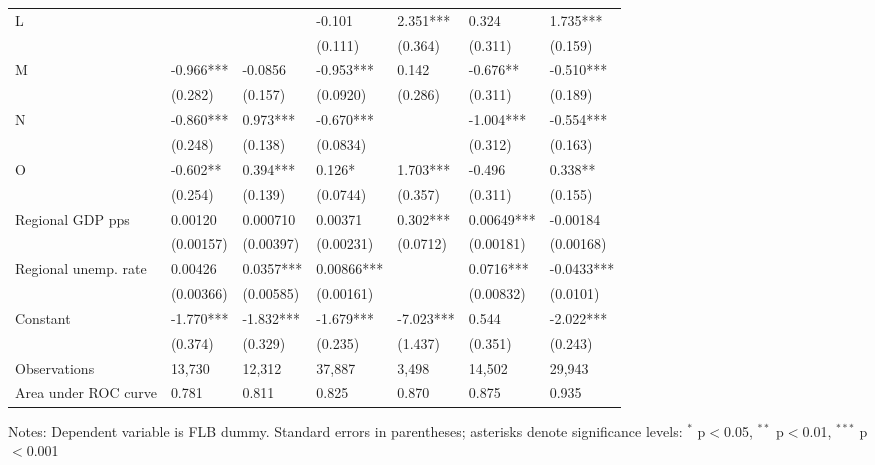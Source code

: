 \documentclass[12pt]{article}
\begin{document}
\begin{table}[thb]
{\begin{threeparttable}
\begin{tabular}{l*{6}{l}}
\quad L                   &            &           & -0.101     & 2.351***  & 0.324      & 1.735***   \\
                          &            &           & (0.111)    & (0.364)   & (0.311)    & (0.159)    \\[0.5ex]

\quad M                   &  -0.966*** & -0.0856   & -0.953***  & 0.142     & -0.676**   & -0.510***  \\
                          &  (0.282)   & (0.157)   & (0.0920)   & (0.286)   & (0.311)    & (0.189)    \\[0.5ex]

\quad N                   &  -0.860*** & 0.973***  & -0.670***  &           & -1.004***  & -0.554***  \\
                          &  (0.248)   & (0.138)   & (0.0834)   &           & (0.312)    & (0.163)    \\[0.5ex]

\quad O                   &  -0.602**  & 0.394***  & 0.126*     & 1.703***  & -0.496     & 0.338**    \\
                          &  (0.254)   & (0.139)   & (0.0744)   & (0.357)   & (0.311)    & (0.155)    \\[0.5ex]

Regional GDP pps          &  0.00120   & 0.000710  & 0.00371    & 0.302***  & 0.00649*** & -0.00184   \\
                          &  (0.00157) & (0.00397) & (0.00231)  & (0.0712)  & (0.00181)  & (0.00168)  \\[0.5ex]

Regional unemp. rate      &  0.00426   & 0.0357*** & 0.00866*** &           & 0.0716***  & -0.0433*** \\
                          &  (0.00366) & (0.00585) & (0.00161)  &           & (0.00832)  & (0.0101)   \\[0.5ex]

Constant                  &  -1.770*** & -1.832*** & -1.679***  & -7.023*** & 0.544      & -2.022***  \\
                          &  (0.374)   & (0.329)   & (0.235)    & (1.437)   & (0.351)    & (0.243)    \\
\midrule
Observations              &  13,730    & 12,312    & 37,887     & 3,498     & 14,502     & 29,943     \\
Area under ROC curve      &  0.781     & 0.811     & 0.825      & 0.870     & 0.875      & 0.935      \\
\bottomrule
\end{tabular}
\begin{tablenotes}
\item Notes: Dependent variable is FLB dummy. Standard errors in parentheses; asterisks denote significance levels: $^{*}$ p$<$0.05, $^{**}$ p$<$0.01, $^{***}$ p$<$0.001
\end{tablenotes}
\end{threeparttable}
} 
\end{table}
\end{document}
